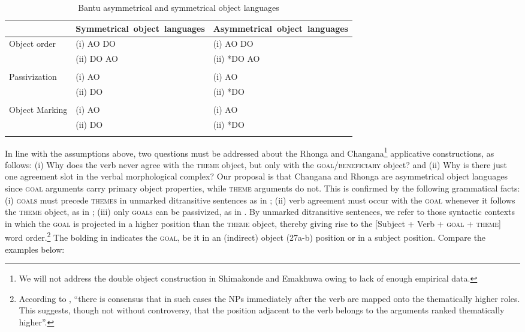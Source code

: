 \documentclass[output=paper]{langsci/langscibook}
\begin{document}
\begin{table}
\caption{Bantu asymmetrical and symmetrical object languages}
\label{tab:3}


\begin{tabularx}{\textwidth}{p{1.8cm}XX}
\lsptoprule
& \mbox{Symmetrical object languages}&\mbox{Asymmetrical object languages}\\
\midrule
 Object order& {(i) AO DO} & (i) AO DO\\
	    & (ii) DO AO  & (ii) *DO AO\\
\\
 
 Passivization& (i) AO & (i) AO\\
	      & (ii) DO&  (ii) *DO\\
 \\
 
 Object Marking& (i) AO &  (i) AO\\
	      & (ii) DO&  (ii) *DO\\
\lspbottomrule
\end{tabularx}
\end{table}

In line with the assumptions above, {two questions must be addressed about the Rhonga and Changana}\footnote{ {We will not address the double object construction in Shimakonde and Emakhuwa owing to lack of enough empirical data. }} {applicative constructions, as follows: (i) Why does the verb never agree with the }{\textsc{theme}} {object, but only with the }{\textsc{goal}}{/}{\textsc{beneficiary}} {object? and (ii) Why is there just one agreement slot in the verbal morphological complex? }Our proposal is that Changana and Rhonga are asymmetrical object languages since \textsc{goal} arguments carry primary object properties, while \textsc{theme} arguments do not. This is confirmed by the following grammatical facts: (i) \textsc{goals} must precede \textsc{themes} in unmarked ditransitive sentences as in ; (ii) verb agreement must occur with the \textsc{goal} whenever it follows the \textsc{theme} object, as in ; (iii) only \textsc{goals} can be passivized, as in . By unmarked ditransitive sentences, we refer to those syntactic contexts in which the \textsc{goal} is projected in a higher position than the \textsc{theme} object, thereby giving rise to the [Subject + Verb + \textsc{goal} + \textsc{theme}] word order.\footnote{ {According to \citet[111]{Chimbutane2002}, “there is consensus that in such cases the NPs immediately after the verb are mapped onto the thematically higher roles. This suggests, though not without controversy, that the position adjacent to the verb belongs to the arguments ranked thematically higher”.}} The bolding in  indicates the \textsc{goal}, be it in an (indirect) object (27a-b) position or in a subject  position. Compare the examples below:
\end{document}
